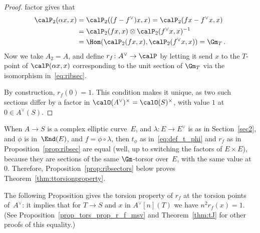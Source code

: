 \begin{proof}
factor gives that
\begin{equation}\label{eq:ribsec}
\begin{split}
\calP_2(\alpha x,x) &= \calP_2((f-f^\vee)x,x) = \calP_2(fx - f^\vee x,x) \\
&= \calP_2(fx,x)\otimes\calP_2(f^\vee x,x)^{-1}\\
&
=\Hom(\calP_2(fx,x),\calP_2(f^\vee x,x)) = {\Gm}_T\, .
\end{split}
\end{equation}
Now we take $A_2=A$, and define $r_f\colon A^\vee \to \calP$ by
letting it send $x$ to the $T$-point of $\calP(\alpha x,x)$
corresponding to the unit section of ${\Gm}_T$ via the isomorphism
in~\eqref{eq:ribsec}.

By construction, $r_f(0)=1$. This condition makes it unique, as two
such sections differ by a factor in $\calO(A^\vee)^\times=\calO(S)^\times$,
with value $1$ at~$0\in A^\vee(S)$.
\end{proof}

\begin{Remark}
When $A \rightarrow S$ is a complex elliptic curve~$E$, and
$\lambda\colon E\to E^\vee$ is as in Section~\ref{sec2}, and $\phi$ is
in~$\End(E)$, and $f=\phi\circ\lambda$, then $t_\phi$ as
in~\eqref{eq:def_t_phi} and $r_f$ as in Proposition~\ref{prop:ribsec} are
equal (well, up to switching the factors of $E\times E$), because they
are sections of the same $\Gm$-torsor over~$E$, with the same value
at~$0$. Therefore, Proposition~\ref{prop:ribsectors} below proves
Theorem~\ref{thm:ttorsionproperty}.
\end{Remark}

The following Proposition gives the torsion property of $r_f$ at the
torsion points of~$A^\vee$: it implies that for $T\to S$ and $x$ in
$A^\vee[n](T)$ we have $n^2r_f(x)=1$. (See
Proposition~\ref{prop_tors_prop_r_f_msv} and Theorem~\ref{thm:tJ} for
other proofs of this equality.)

